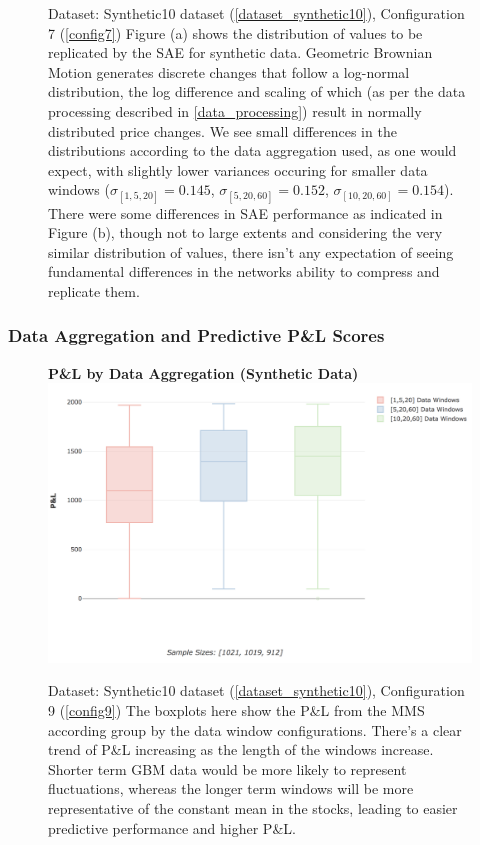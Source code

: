 \documentclass[a4paper,11pt,oneside]{article}
\theoremstyle{plain}
\theoremstyle{definition}
\begin{document}
\begin{figure}[H]
		\caption[SAE MSE Scores for Synthetic Data]{Dataset: Synthetic10 dataset (\ref{dataset_synthetic10}), Configuration 7 (\ref{config7})
			\newline Figure (a) shows the distribution of values to be replicated by the SAE for synthetic data. Geometric Brownian Motion generates discrete changes that follow a log-normal distribution, the log difference and scaling of which (as per the data processing described in \ref{data_processing}) result in normally distributed price changes. We see small differences in the distributions according to the data aggregation used, as one would expect, with slightly lower variances occuring for smaller data windows ($\sigma_{[1,5,20]} = 0.145$, $\sigma_{[5,20,60]} = 0.152$, $\sigma_{[10,20,60]} = 0.154$). There were some differences in SAE performance as indicated in Figure (b), though not to large extents and considering the very similar distribution of values, there isn't any expectation of seeing fundamental differences in the networks ability to compress and replicate them. }
		\label{figure-data_sae_synthetic}
	\end{figure}
	

	
	
	\subsubsection{Data Aggregation and Predictive P\&L Scores}\label{results_data_pl}
	
	\begin{figure}[H]
		\centering 
		\textbf{P\&L by Data Aggregation (Synthetic Data)}
		\includegraphics[scale=0.4]{images/results/data/test_aggregation_pl.png}
		\caption[P\&L by Data Aggregation (Synthetic Data)]{
			Dataset: Synthetic10 dataset (\ref{dataset_synthetic10}), Configuration 9 (\ref{config9})
			\newline  The boxplots here show the P\&L from the MMS according group by the data window configurations. There's a clear trend of P\&L increasing as the length of the windows increase. Shorter term GBM data would be more likely to represent fluctuations, whereas the longer term windows will be more representative of the constant mean in the stocks, leading to easier predictive performance and higher P\&L.}
		\label{figure-test_aggregation_pl}
	\end{figure}
	
\end{document}
